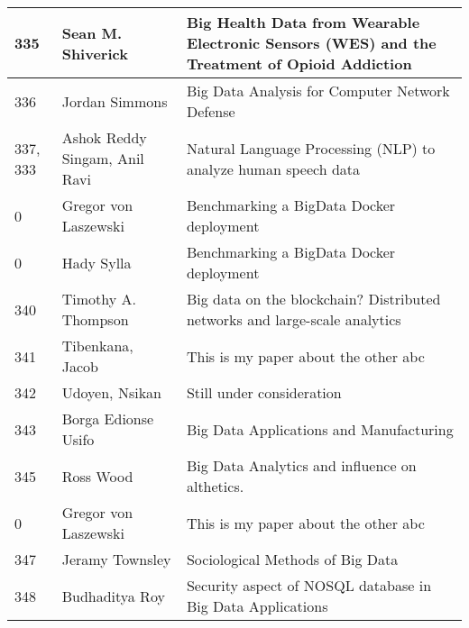 \documentclass[12pt]{book}
\begin{document}
\begin{footnotesize}
\begin{longtable}{|p{1cm}p{5cm}p{9cm}|}
\hline
335 & Sean M. Shiverick & Big Health Data from Wearable Electronic Sensors (WES) and the Treatment of Opioid Addiction
  \\
\hline
336 & Jordan Simmons & Big Data Analysis for Computer Network Defense  \\
\hline
337, 333 & Ashok Reddy Singam, Anil Ravi & Natural Language Processing (NLP) to analyze human speech data  \\
\hline
0 & Gregor von Laszewski & Benchmarking a BigData Docker deployment  \\
\hline
0 & Hady Sylla & Benchmarking a BigData Docker deployment  \\
\hline
340 & Timothy A. Thompson & Big data on the blockchain? Distributed networks and large-scale analytics  \\
\hline
341 & Tibenkana, Jacob & This is my paper about the other abc  \\
\hline
342 & Udoyen, Nsikan & Still under consideration  \\
\hline
343 & Borga Edionse Usifo & Big Data Applications and Manufacturing  \\
\hline
345 & Ross Wood & Big Data Analytics and influence on althetics.  \\
\hline
0 & Gregor von Laszewski & This is my paper about the other abc  \\
\hline
347 & Jeramy Townsley & Sociological Methods of Big Data  \\
\hline
348 & Budhaditya Roy & Security aspect of NOSQL database in Big Data Applications  \\
\hline
\end{longtable}
\end{footnotesize}
\newpage
\end{document}
